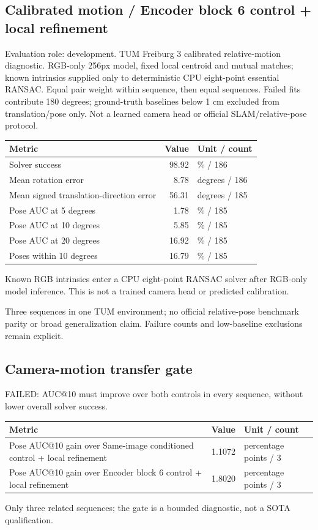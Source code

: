 \documentclass[10pt]{article}
\begin{document}
\subsection{Calibrated motion / Encoder block 6 control + local refinement}
Evaluation role: development. TUM Freiburg 3 calibrated relative-motion diagnostic. RGB-only 256px model, fixed local centroid and mutual matches; known intrinsics supplied only to deterministic CPU eight-point essential RANSAC. Equal pair weight within sequence, then equal sequences. Failed fits contribute 180 degrees; ground-truth baselines below 1 cm excluded from translation/pose only. Not a learned camera head or official SLAM/relative-pose protocol.
\begin{center}\begin{tabular}{p{.57\linewidth}rp{.23\linewidth}}\toprule Metric & Value & Unit / count \\ \midrule
Solver success & 98.92 & \% / 186 \\
Mean rotation error & 8.78 & degrees / 186 \\
Mean signed translation-direction error & 56.31 & degrees / 185 \\
Pose AUC at 5 degrees & 1.78 & \% / 185 \\
Pose AUC at 10 degrees & 5.85 & \% / 185 \\
Pose AUC at 20 degrees & 16.92 & \% / 185 \\
Poses within 10 degrees & 16.79 & \% / 185 \\
\bottomrule\end{tabular}\end{center}
Known RGB intrinsics enter a CPU eight-point RANSAC solver after RGB-only model inference. This is not a trained camera head or predicted calibration.

Three sequences in one TUM environment; no official relative-pose benchmark parity or broad generalization claim. Failure counts and low-baseline exclusions remain explicit.

\subsection{Camera-motion transfer gate}
FAILED: AUC@10 must improve over both controls in every sequence, without lower overall solver success.
\begin{center}\begin{tabular}{p{.57\linewidth}rp{.23\linewidth}}\toprule Metric & Value & Unit / count \\ \midrule
Pose AUC@10 gain over Same-image conditioned control + local refinement & 1.1072 & percentage points / 3 \\
Pose AUC@10 gain over Encoder block 6 control + local refinement & 1.8020 & percentage points / 3 \\
\bottomrule\end{tabular}\end{center}
Only three related sequences; the gate is a bounded diagnostic, not a SOTA qualification.
\end{document}
